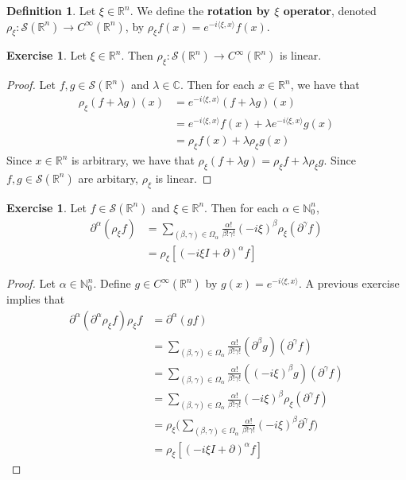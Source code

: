 \documentclass[12pt]{amsart}
\theoremstyle{definition}
\newtheorem{defn}[definition]{Definition}
\newtheorem{ex}[definition]{Exercise}
\newcommand{\p}{\partial}
\newcommand{\al}{\alpha}
\newcommand{\be}{\beta}
\newcommand{\gam}{\gamma}
\newcommand{\lam}{\lambda}
\newcommand{\Om}{\Omega}
\newcommand{\C}{\mathbb{C}}
\newcommand{\N}{\mathbb{N}}
\newcommand{\R}{\mathbb{R}}
\newcommand{\MS}{\mathcal{S}}
\renewcommand{\r}{\rangle}
\renewcommand{\l}{\langle}
\begin{document}
	\begin{defn}
		Let $\xi \in \R^n$. We define the \textbf{rotation by $\xi$ operator}, denoted $\rho_{\xi}: \MS(\R^n) \rightarrow C^{\infty}(\R^n)$, by $\rho_{\xi}f(x) = e^{-i \l \xi, x \r }f(x)$.
	\end{defn}

	\begin{ex}
		Let $\xi \in \R^n$. Then $\rho_{\xi}: \MS(\R^n) \rightarrow C^{\infty}(\R^n)$ is linear.
	\end{ex}

	\begin{proof}
		Let $f, g \in \MS(\R^n)$ and $\lam \in \C$. Then for each $x \in \R^n$, we have that
		\begin{align*}
			\rho_{\xi}(f + \lam g)(x) 
			& = e^{-i \l \xi, x\r}(f+ \lam g)(x) \\
			& = e^{-i \l \xi, x\r}f(x) + \lam e^{-i \l \xi, x\r} g(x) \\
			& = \rho_{\xi}f (x) + \lam \rho_{\xi} g(x)
		\end{align*}
		Since $x \in \R^n$ is arbitrary, we have that $\rho_{\xi} (f + \lam g) = \rho_{\xi} f + \lam \rho_{\xi} g$. Since $f, g \in \MS(\R^n)$ are arbitary, $\rho_{\xi}$ is linear. 
	\end{proof}

	\begin{ex}
		Let $f \in \MS(\R^n)$ and $\xi \in \R^n$. Then for each $\al \in \N_0^n$,  
		\begin{align*}
			\p^{\al} (\rho_{\xi} f)
			& =  \sum_{(\be, \gam) \in \Om_{\al}} \frac{\al!}{\be! \gam!} (-i \xi)^{\be} \rho_{\xi}( \p^{\gam} f) \\
			& =  \rho_{\xi}[(-i\xi I + \p)^{\al} f]
		\end{align*}
	\end{ex}
	
	\begin{proof}
		Let $\al \in \N_0^n$. Define $g \in C^{\infty}(\R^n)$ by $g(x) = e^{-i \l \xi, x \r}$. A previous exercise implies that 
		\begin{align*}
			\p^{\al}(\p^{\al} \rho_{\xi}f)\rho_{\xi} f 
			& = \p^{\al} (gf) \\
			& = \sum_{(\be, \gam) \in \Om_{\al}} \frac{\al!}{\be! \gam!}( \p^{\be} g) (\p^{\gam} f) \\
			& = \sum_{(\be, \gam) \in \Om_{\al}} \frac{\al!}{\be! \gam!}((-i \xi)^{\be} g) (\p^{\gam} f) \\
			& = \sum_{(\be, \gam) \in \Om_{\al}} \frac{\al!}{\be! \gam!} (-i \xi)^{\be} \rho_{\xi}( \p^{\gam} f) \\
			& = \rho_{\xi} \bigg( \sum_{(\be, \gam) \in \Om_{\al}} \frac{\al!}{\be! \gam!} (-i \xi)^{\be}  \p^{\gam} f \bigg ) \\
			& = \rho_{\xi}[(-i\xi I + \p)^{\al} f]
		\end{align*}
	\end{proof}
\end{document}
